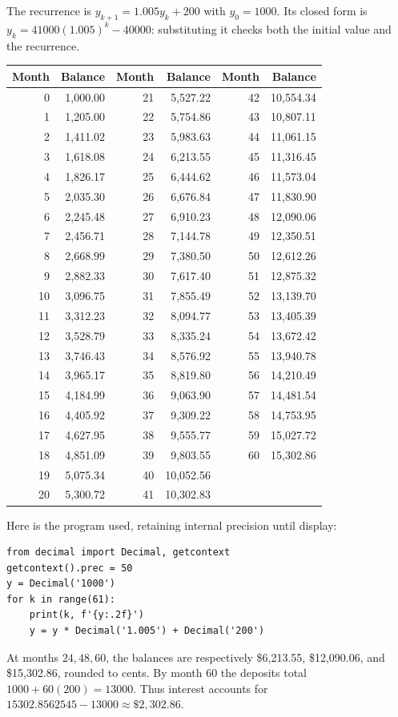 The recurrence is $y_{k+1}=1.005y_k+200$ with $y_0=1000$.
Its closed form is $y_k=41000(1.005)^k-40000$: substituting it checks both
the initial value and the recurrence.
\begin{center}\begin{tabular}{rrrrrr}
\toprule
Month&Balance&Month&Balance&Month&Balance\\\midrule
0&1,000.00&21&5,527.22&42&10,554.34\\
1&1,205.00&22&5,754.86&43&10,807.11\\
2&1,411.02&23&5,983.63&44&11,061.15\\
3&1,618.08&24&6,213.55&45&11,316.45\\
4&1,826.17&25&6,444.62&46&11,573.04\\
5&2,035.30&26&6,676.84&47&11,830.90\\
6&2,245.48&27&6,910.23&48&12,090.06\\
7&2,456.71&28&7,144.78&49&12,350.51\\
8&2,668.99&29&7,380.50&50&12,612.26\\
9&2,882.33&30&7,617.40&51&12,875.32\\
10&3,096.75&31&7,855.49&52&13,139.70\\
11&3,312.23&32&8,094.77&53&13,405.39\\
12&3,528.79&33&8,335.24&54&13,672.42\\
13&3,746.43&34&8,576.92&55&13,940.78\\
14&3,965.17&35&8,819.80&56&14,210.49\\
15&4,184.99&36&9,063.90&57&14,481.54\\
16&4,405.92&37&9,309.22&58&14,753.95\\
17&4,627.95&38&9,555.77&59&15,027.72\\
18&4,851.09&39&9,803.55&60&15,302.86\\
19&5,075.34&40&10,052.56&&\\
20&5,300.72&41&10,302.83&&\\
\bottomrule\end{tabular}\end{center}
Here is the program used, retaining internal precision until display:
\begin{verbatim}
from decimal import Decimal, getcontext
getcontext().prec = 50
y = Decimal('1000')
for k in range(61):
    print(k, f'{y:.2f}')
    y = y * Decimal('1.005') + Decimal('200')
\end{verbatim}
At months $24,48,60$, the balances are respectively
\$6,213.55, \$12,090.06, and \$15,302.86, rounded to cents.
By month $60$ the deposits total $1000+60(200)=13000$.
Thus interest accounts for $15302.8562545-13000\approx\$2{,}302.86$.

